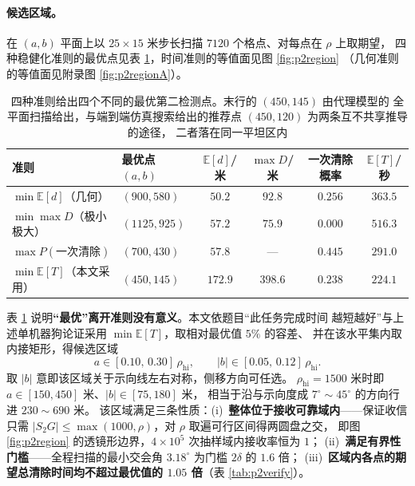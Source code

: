 \documentclass[withoutpreface, bwprint]{cumcmthesis}
\begin{document}
\paragraph{候选区域。}
在 $(a,b)$ 平面上以 $25\times15$ 米步长扫描 $7120$ 个格点、对每点在 $\rho$ 上取期望，
四种稳健化准则的最优点见表 \ref{tab:p2compare}，时间准则的等值面见图 \ref{fig:p2region}
（几何准则的等值面见附录图 \ref{fig:p2regionA}）。

\begin{table}[H]
  \centering
  \caption{四种准则给出四个不同的最优第二检测点。末行的 $(450,145)$ 由代理模型的
    全平面扫描给出，与端到端仿真搜索给出的推荐点 $(450,120)$ 为两条互不共享推导的途径，
    二者落在同一平坦区内}
  \label{tab:p2compare}
  \footnotesize
  \begin{tabular}{llcccc}
    \toprule
    准则 & 最优点 $(a,b)$ & $\mathbb{E}[d]$/米 & $\max D$/米 & 一次清除概率 & $\mathbb{E}[T]$/秒 \\
    \midrule
    $\min\mathbb{E}[d]$（几何）    & $(900,580)$  & $\mathbf{50.2}$ & $92.8$ & $0.256$ & $363.5$ \\
    $\min\max D$（极小极大）        & $(1125,925)$ & $57.2$ & $\mathbf{75.9}$ & $0.000$ & $516.3$ \\
    $\max P(\text{一次清除})$       & $(700,430)$  & $57.8$ & --- & $\mathbf{0.445}$ & $291.0$ \\
    $\min\mathbb{E}[T]$（本文采用） & $(450,145)$  & $172.9$ & $398.6$ & $0.238$ & $\mathbf{224.1}$ \\
    \bottomrule
  \end{tabular}
\end{table}

表 \ref{tab:p2compare} 说明\textbf{“最优”离开准则没有意义}。本文依题目“此任务完成时间
越短越好”与上述单机器狗论证采用 $\min\mathbb{E}[T]$，取相对最优值 $5\%$ 的容差、
并在该水平集内取内接矩形，得候选区域
\begin{equation}
  a\in[0.10,\,0.30]\,\rho_{\mathrm{hi}},\qquad
  \lvert b\rvert\in[0.05,\,0.12]\,\rho_{\mathrm{hi}} .
  \label{eq:p2region}
\end{equation}
取 $\lvert b\rvert$ 意即该区域关于示向线左右对称，侧移方向可任选。
$\rho_{\mathrm{hi}}=1500$ 米时即 $a\in[150,450]$ 米、$|b|\in[75,180]$ 米，
相当于沿与示向度成 $7^\circ\!\sim\!45^\circ$ 的方向行进 $230\!\sim\!690$ 米。
该区域满足三条性质：(i)~\textbf{整体位于接收可靠域内}——保证收信只需
$|S_2G|\le\max(1000,\rho)$，对 $\rho$ 取遍可行区间得两圆盘之交，
即图 \ref{fig:p2region} 的透镜形边界，$4\times10^5$ 次抽样域内接收率恒为 $1$；
(ii)~\textbf{满足有界性门槛}——全程扫描的最小交会角 $3.18^\circ$ 为门槛 $2\delta$ 的 $1.6$ 倍；
(iii)~\textbf{区域内各点的期望总清除时间均不超过最优值的 $1.05$ 倍}（表 \ref{tab:p2verify}）。
\end{document}
